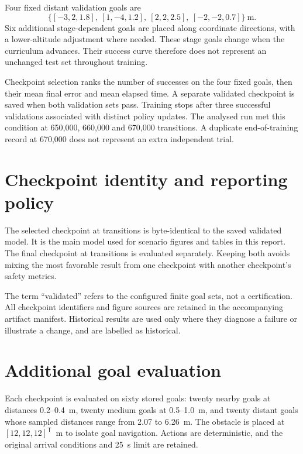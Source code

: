 Four fixed distant validation goals are
\begin{equation}
\{[-3,2,1.8],\ [1,-4,1.2],\ [2,2,2.5],\ [-2,-2,0.7]\}\ \mathrm{m}.
\end{equation}
Six additional stage-dependent goals are placed along coordinate directions, with a lower-altitude adjustment where needed. These stage goals change when the curriculum advances. Their success curve therefore does not represent an unchanged test set throughout training.

Checkpoint selection ranks the number of successes on the four fixed goals, then their mean final error and mean elapsed time. A separate validated checkpoint is saved when both validation sets pass. Training stops after three successful validations associated with distinct policy updates. The analysed run met this condition at 650,000, 660,000 and 670,000 transitions. A duplicate end-of-training record at 670,000 does not represent an extra independent trial.

\section{Checkpoint identity and reporting policy}
The selected checkpoint at \selectedsteps{} transitions is byte-identical to the saved validated model. It is the main model used for scenario figures and tables in this report. The final checkpoint at \finalsteps{} transitions is evaluated separately. Keeping both avoids mixing the most favorable result from one checkpoint with another checkpoint's safety metrics.

The term ``validated'' refers to the configured finite goal sets, not a certification. All checkpoint identifiers and figure sources are retained in the accompanying artifact manifest. Historical results are used only where they diagnose a failure or illustrate a change, and are labelled as historical.

\section{Additional goal evaluation}
Each checkpoint is evaluated on sixty stored goals: twenty nearby goals at distances 0.2--0.4~m, twenty medium goals at 0.5--1.0~m, and twenty distant goals whose sampled distances range from 2.07 to 6.26~m. The obstacle is placed at $[12,12,12]^\mathsf{T}$~m to isolate goal navigation. Actions are deterministic, and the original arrival conditions and 25~s limit are retained.

